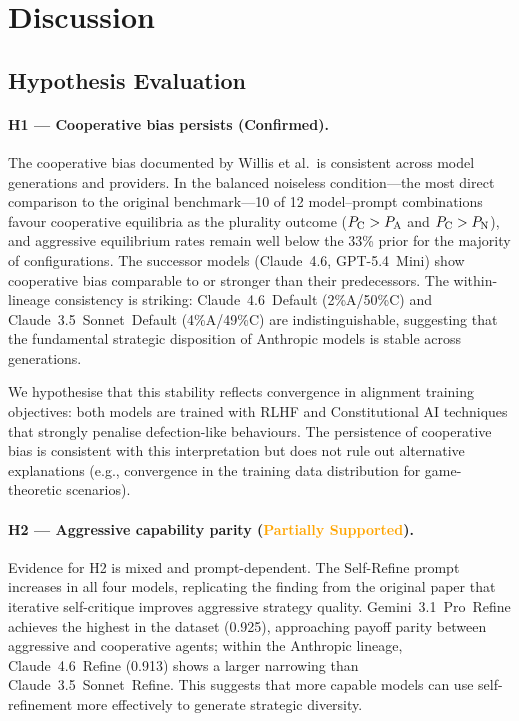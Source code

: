 \section{Discussion}
\label{sec:discussion}

\subsection{Hypothesis Evaluation}

\paragraph{H1 — Cooperative bias persists (\textcolor{green!60!black}{Confirmed}).}
The cooperative bias documented by Willis et al.\ is consistent across model generations
and providers. In the balanced noiseless condition---the most direct comparison
to the original benchmark---10 of 12 model--prompt combinations favour
cooperative equilibria as the plurality outcome ($P_{\mathrm{C}} > P_{\mathrm{A}}$ and $P_{\mathrm{C}} > P_{\mathrm{N}}$),
and aggressive equilibrium rates remain well below the 33\% prior for the
majority of configurations. The successor models (Claude~4.6, GPT-5.4~Mini)
show cooperative bias comparable to or stronger than their predecessors.
The within-lineage consistency is striking: Claude~4.6~Default (2\%A/50\%C)
and Claude~3.5~Sonnet~Default (4\%A/49\%C) are indistinguishable, suggesting
that the fundamental strategic disposition of Anthropic models is stable across
generations.

We hypothesise that this stability reflects convergence in alignment training
objectives: both models are trained with RLHF and Constitutional AI techniques
that strongly penalise defection-like behaviours. The persistence of cooperative
bias is consistent with this interpretation but does not rule out alternative
explanations (e.g., convergence in the training data distribution for
game-theoretic scenarios).

\paragraph{H2 — Aggressive capability parity (\textcolor{orange}{Partially Supported}).}
Evidence for H2 is mixed and prompt-dependent. The Self-Refine prompt increases
\ICD in all four models, replicating the finding from the original paper that
iterative self-critique improves aggressive strategy quality. Gemini~3.1~Pro~Refine
achieves the highest \ICD in the dataset (0.925), approaching payoff parity
between aggressive and cooperative agents; within the Anthropic lineage,
Claude~4.6~Refine (0.913) shows a larger narrowing than
Claude~3.5~Sonnet~Refine. This suggests that more capable models can
use self-refinement more effectively to generate strategic diversity.

